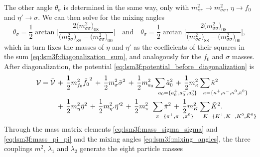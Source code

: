 The other angle $\theta_\sigma$ is determined in the same way, only with $m^2_{\pi\pi} \rightarrow m^2_{\sigma\sigma}$, $\eta \rightarrow f_0$ and $\eta' \rightarrow \sigma$.
We can then solve for the mixing angles
\begin{equation}
	\theta_\sigma = \frac12 \arctan \Bigg[ \frac{2\big(m^2_{\sigma\sigma}\big)_{08}}{\big(m^2_{\sigma\sigma}\big)_{88} - \big(m^2_{\sigma\sigma}\big)_{00}} \Bigg]
	\quad \text{and} \quad
	\theta_\sigma = \frac12 \arctan \Bigg[ \frac{2\big(m^2_{\sigma\sigma}\big)_{08}}{\big(m^2_{\sigma\sigma}\big)_{88} - \big(m^2_{\sigma\sigma}\big)_{00}} \Bigg],
\label{eq:lsm3f:mixing_angles}
\end{equation}
which in turn fixes the masses of $\eta$ and $\eta'$ as the coefficients of their squares in the sum \eqref{eq:lsm3f:diagonalization_sum}, and analogously for the $f_0$ and $\sigma$ masses.
After diagonalization, the potential \eqref{eq:lsm3f:potential_before_diagonalization} is
\begin{equation}
\begin{split}
	\pot = \bar{\pot} \, &+ \, \frac12 m^2_{f_0} \tilde{f_0}^2  \, + \, \frac12 m^2_{\sigma} \tilde{\sigma}^2 \, + \, \frac12 m^2_{a_0} \sum_{\mathrlap{\!\!a_0 = \{a_0^+,a_0^-,a_0^0\}}} \tilde{a}_0^2               \, + \, \frac12 m^2_{\kappa} \sum_{\mathrlap{\!\!\kappa = \{\kappa^+,\kappa^-,\kappa^0,\bar{\kappa}^0\}}} \tilde{\kappa}^2 \\
	                  \, &+ \, \frac12 m^2_{\eta} \tilde{\eta}^2 \, + \, \frac12 m^2_{\eta'} \tilde{\eta}'^2   \, + \, \frac12 m^2_{\pi_{\phantom{0}}} \sum_{\mathrlap{\!\!\pi = \{\pi^+,\pi^-,\pi^0\}}} \tilde{\pi}^2 \, + \, \frac12 m^2_{K} \sum_{\mathrlap{\!\!K = \{K^+,K^-,K^0,\bar{K}^0\}}} \tilde{K}^2. \\
\end{split}
\label{eq:lsm3f:potential_after_diagonalization}
\end{equation}
Through the mass matrix elements \eqref{eq:lsm3f:mass_sigma_sigma} and \eqref{eq:lsm3f:mass_pi_pi} and the mixing angles \eqref{eq:lsm3f:mixing_angles},
the three couplings $m^2$, $\lambda_1$ and $\lambda_2$ generate the eight particle masses
